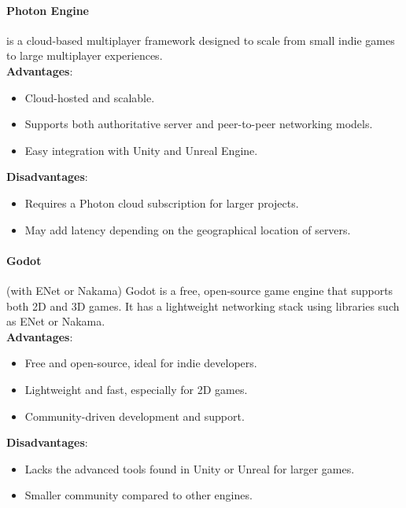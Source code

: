 \documentclass{article} %
\begin{document}
\paragraph{Photon Engine} is a cloud-based multiplayer framework designed to scale from small indie games to large multiplayer experiences.
\\
\textbf{Advantages}:
\begin{itemize}
	\item Cloud-hosted and scalable.
	\item Supports both authoritative server and peer-to-peer networking models.
	\item Easy integration with Unity and Unreal Engine.
\end{itemize}
\textbf{Disadvantages}:
\begin{itemize}
	\item Requires a Photon cloud subscription for larger projects.
	\item May add latency depending on the geographical location of servers.
\end{itemize}

\paragraph{Godot} (with ENet or Nakama) Godot is a free,
open-source game engine that supports both 2D and 3D games.
It has a lightweight networking stack using libraries such as ENet or Nakama.
\\
\textbf{Advantages}:
\begin{itemize}
	\item Free and open-source, ideal for indie developers.
	\item Lightweight and fast, especially for 2D games.
	\item Community-driven development and support.
\end{itemize}
\textbf{Disadvantages}:
\begin{itemize}
	\item Lacks the advanced tools found in Unity or Unreal for larger games.
	\item Smaller community compared to other engines.
\end{itemize}
\end{document}
